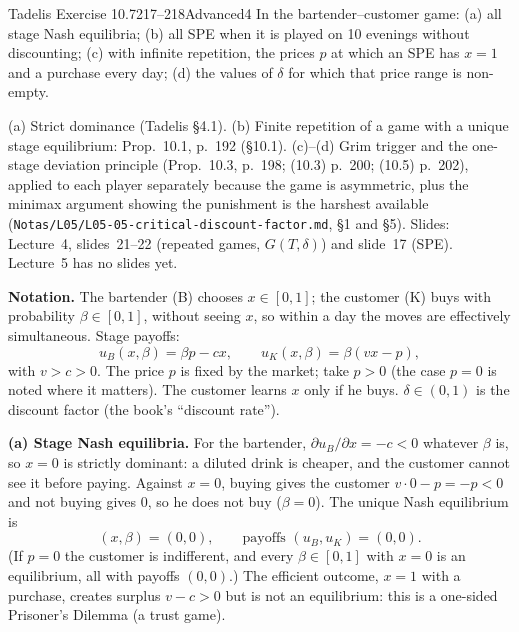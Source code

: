 \begin{exsol}{Tadelis Exercise 10.7}{217--218}{Advanced}{4}
\asked In the bartender--customer game: (a) all stage Nash equilibria; (b) all SPE when it is played
on 10 evenings without discounting; (c) with infinite repetition, the prices $p$ at which an SPE has
$x = 1$ and a purchase every day; (d) the values of $\delta$ for which that price range is non-empty.

\method (a) Strict dominance (Tadelis \S4.1). (b) Finite repetition of a game with a unique stage
equilibrium: Prop.~10.1, p.~192 (\S10.1). (c)--(d) Grim trigger and the one-stage deviation principle
(Prop.~10.3, p.~198; (10.3) p.~200; (10.5) p.~202), applied to each player separately because the
game is asymmetric, plus the minimax argument showing the punishment is the harshest available
(\texttt{Notas/L05/L05-05-critical-discount-factor.md}, \S1 and \S5). Slides: Lecture~4, slides~21--22
(repeated games, $G(T,\delta)$) and slide~17 (SPE). Lecture~5 has no slides yet.

\solution
\textbf{Notation.} The bartender (B) chooses $x \in [0,1]$; the customer (K) buys with probability
$\beta \in [0,1]$, without seeing $x$, so within a day the moves are effectively simultaneous. Stage
payoffs:
\[
  u_B(x,\beta) = \beta p - c x, \qquad u_K(x, \beta) = \beta (v x - p),
\]
with $v > c > 0$. The price $p$ is fixed by the market; take $p > 0$ (the case $p = 0$ is noted where
it matters). The customer learns $x$ only if he buys. $\delta \in (0,1)$ is the discount factor
(the book's ``discount rate'').

\textbf{(a) Stage Nash equilibria.} For the bartender, $\partial u_B/\partial x = -c < 0$ whatever
$\beta$ is, so $x = 0$ is strictly dominant: a diluted drink is cheaper, and the customer cannot see it
before paying. Against $x = 0$, buying gives the customer $v\cdot 0 - p = -p < 0$ and not buying gives
$0$, so he does not buy ($\beta = 0$). The unique Nash equilibrium is
\[
  (x, \beta) = (0, 0), \qquad \text{payoffs } (u_B, u_K) = (0, 0).
\]
(If $p = 0$ the customer is indifferent, and every $\beta \in [0,1]$ with $x = 0$ is an equilibrium,
all with payoffs $(0,0)$.) The efficient outcome, $x = 1$ with a purchase, creates surplus $v - c > 0$
but is not an equilibrium: this is a one-sided Prisoner's Dilemma (a trust game).


\end{exsol}
